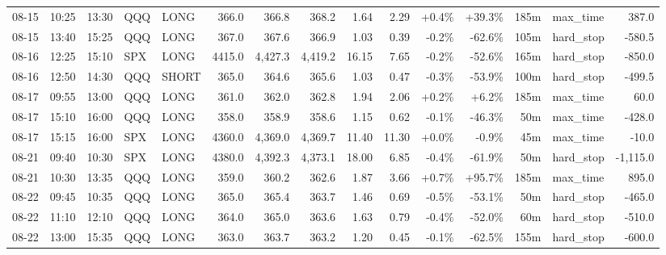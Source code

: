 \documentclass[11pt,a4paper,twoside]{article}
\begin{document}
\begin{landscape}
\begin{center}
\begin{longtable}{>{\color{txtmain}}l l l l l r r r r r r r r >{\color{txtmain}}l r}
08-15 & 10:25 & 13:30 & QQQ & LONG & 366.0 & 366.8 & 368.2 & 1.64 & 2.29 & \textcolor{wingreen}{+0.4\%} & \textcolor{wingreen}{+39.3\%} & 185m & max\_time & \textcolor{wingreen}{387.0} \\
08-15 & 13:40 & 15:25 & QQQ & LONG & 367.0 & 367.6 & 366.9 & 1.03 & 0.39 & \textcolor{lossred}{-0.2\%} & \textcolor{lossred}{-62.6\%} & 105m & hard\_stop & \textcolor{lossred}{-580.5} \\
08-16 & 12:25 & 15:10 & SPX & LONG & 4415.0 & 4,427.3 & 4,419.2 & 16.15 & 7.65 & \textcolor{lossred}{-0.2\%} & \textcolor{lossred}{-52.6\%} & 165m & hard\_stop & \textcolor{lossred}{-850.0} \\
08-16 & 12:50 & 14:30 & QQQ & SHORT & 365.0 & 364.6 & 365.6 & 1.03 & 0.47 & \textcolor{lossred}{-0.3\%} & \textcolor{lossred}{-53.9\%} & 100m & hard\_stop & \textcolor{lossred}{-499.5} \\
08-17 & 09:55 & 13:00 & QQQ & LONG & 361.0 & 362.0 & 362.8 & 1.94 & 2.06 & \textcolor{wingreen}{+0.2\%} & \textcolor{wingreen}{+6.2\%} & 185m & max\_time & \textcolor{wingreen}{60.0} \\
08-17 & 15:10 & 16:00 & QQQ & LONG & 358.0 & 358.9 & 358.6 & 1.15 & 0.62 & \textcolor{lossred}{-0.1\%} & \textcolor{lossred}{-46.3\%} & 50m & max\_time & \textcolor{lossred}{-428.0} \\
08-17 & 15:15 & 16:00 & SPX & LONG & 4360.0 & 4,369.0 & 4,369.7 & 11.40 & 11.30 & \textcolor{wingreen}{+0.0\%} & \textcolor{lossred}{-0.9\%} & 45m & max\_time & \textcolor{lossred}{-10.0} \\
08-21 & 09:40 & 10:30 & SPX & LONG & 4380.0 & 4,392.3 & 4,373.1 & 18.00 & 6.85 & \textcolor{lossred}{-0.4\%} & \textcolor{lossred}{-61.9\%} & 50m & hard\_stop & \textcolor{lossred}{-1,115.0} \\
08-21 & 10:30 & 13:35 & QQQ & LONG & 359.0 & 360.2 & 362.6 & 1.87 & 3.66 & \textcolor{wingreen}{+0.7\%} & \textcolor{wingreen}{+95.7\%} & 185m & max\_time & \textcolor{wingreen}{895.0} \\
08-22 & 09:45 & 10:35 & QQQ & LONG & 365.0 & 365.4 & 363.7 & 1.46 & 0.69 & \textcolor{lossred}{-0.5\%} & \textcolor{lossred}{-53.1\%} & 50m & hard\_stop & \textcolor{lossred}{-465.0} \\
08-22 & 11:10 & 12:10 & QQQ & LONG & 364.0 & 365.0 & 363.6 & 1.63 & 0.79 & \textcolor{lossred}{-0.4\%} & \textcolor{lossred}{-52.0\%} & 60m & hard\_stop & \textcolor{lossred}{-510.0} \\
08-22 & 13:00 & 15:35 & QQQ & LONG & 363.0 & 363.7 & 363.2 & 1.20 & 0.45 & \textcolor{lossred}{-0.1\%} & \textcolor{lossred}{-62.5\%} & 155m & hard\_stop & \textcolor{lossred}{-600.0} \\

\end{longtable}
\end{center}
\end{landscape}
\end{document}
